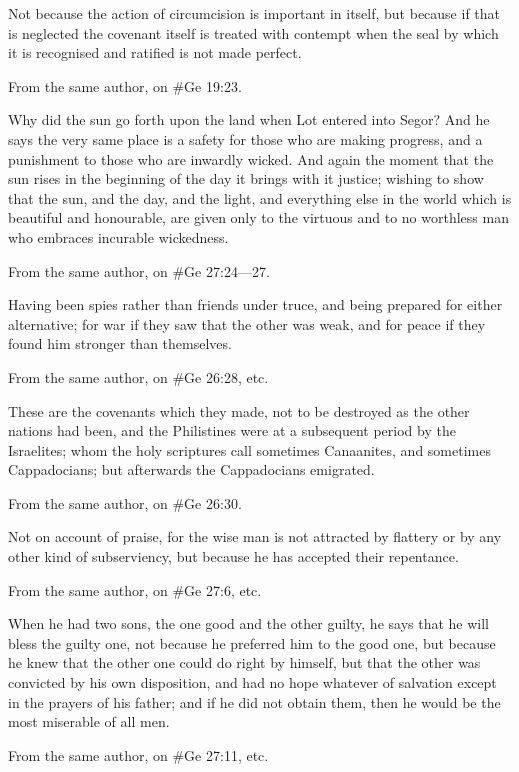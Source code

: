Not because the action of circumcision is important in itself, but because if that is neglected the
covenant itself is treated with contempt when the seal by which it is recognised and ratified is not made
perfect.

From the same author, on \#Ge 19:23.

Why did the sun go forth upon the land when Lot entered into Segor? And he says the very same place is
a safety for those who are making progress, and a punishment to those who are inwardly wicked. And
again the moment that the sun rises in the beginning of the day it brings with it justice; wishing to show
that the sun, and the day, and the light, and everything else in the world which is beautiful and
honourable, are given only to the virtuous and to no worthless man who embraces incurable
wickedness.

From the same author, on \#Ge 27:24—27.

Having been spies rather than friends under truce, and being prepared for either alternative; for war if
they saw that the other was weak, and for peace if they found him stronger than themselves.

From the same author, on \#Ge 26:28, etc.

These are the covenants which they made, not to be destroyed as the other nations had been, and the
Philistines were at a subsequent period by the Israelites; whom the holy scriptures call sometimes
Canaanites, and sometimes Cappadocians; but afterwards the Cappadocians emigrated.

From the same author, on \#Ge 26:30.

Not on account of praise, for the wise man is not attracted by flattery or by any other kind of
subserviency, but because he has accepted their repentance.

From the same author, on \#Ge 27:6, etc.

When he had two sons, the one good and the other guilty, he says that he will bless the guilty one, not
because he preferred him to the good one, but because he knew that the other one could do right by
himself, but that the other was convicted by his own disposition, and had no hope whatever of salvation
except in the prayers of his father; and if he did not obtain them, then he would be the most miserable of
all men.

From the same author, on \#Ge 27:11, etc.

